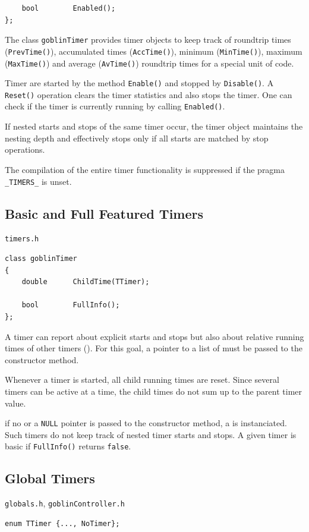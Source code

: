 \documentclass[a4paper,11pt,twoside]{book}
\begin{document}
\begin{multicols}{2}
\begin{mymethods}
\begin{verbatim}
    bool        Enabled();
};
\end{verbatim}
\end{mymethods}
The class \verb/goblinTimer/ provides timer objects to keep track of
roundtrip times (\verb/PrevTime()/), accumulated times (\verb/AccTime()/),
minimum (\verb/MinTime()/), maximum (\verb/MaxTime()/) and average
(\verb/AvTime()/) roundtrip times for a special unit of code.

Timer are started by the method \verb/Enable()/ and stopped by
\verb/Disable()/. A \verb/Reset()/ operation clears the timer statistics
and also stops the timer. One can check if the timer is currently running by
calling \verb/Enabled()/.

If nested starts and stops of the same timer occur, the timer object maintains
the nesting depth and effectively stops only if all starts are matched by stop
operations.

The compilation of the entire timer functionality is suppressed if the pragma
\verb/_TIMERS_/ is unset.


\subsection{Basic and Full Featured Timers}
\myincludes\verb/timers.h/
\begin{mymethods}
\begin{verbatim}
class goblinTimer
{
    double      ChildTime(TTimer);

    bool        FullInfo();
};
\end{verbatim}
\end{mymethods}
A timer can report about explicit starts and stops but also about relative
running times of other timers (). For this goal, a pointer
to a list of  must be passed to the constructor method.

Whenever a timer is started, all child running times are reset. Since several
timers can be active at a time, the child times do not sum up to the parent
timer value.

if no or a \verb/NULL/ pointer is passed to the constructor method, a
 is instanciated. Such timers do not keep track of nested
timer starts and stops. A given timer is basic if \verb/FullInfo()/ returns
\verb/false/.


\subsection{Global Timers}
\label{slb_global_timers}
\myincludes\verb/globals.h/, \verb/goblinController.h/
\begin{mymethods}
\begin{verbatim}
enum TTimer {..., NoTimer};


\end{verbatim}
\end{mymethods}
\end{multicols}
\end{document}
